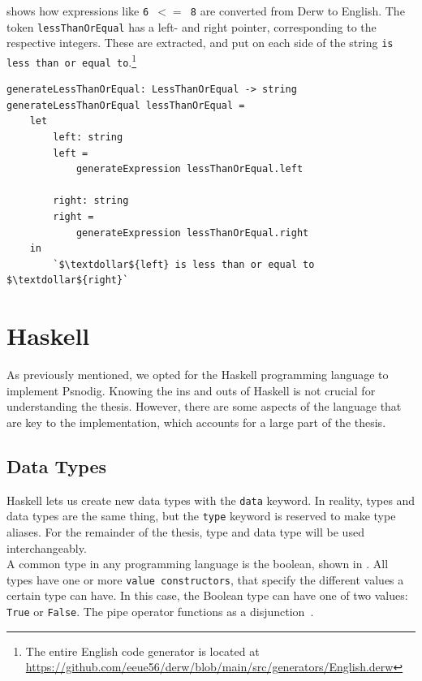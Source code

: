  shows how expressions like \texttt{6 $<=$ 8} are converted from Derw to English. The token \texttt{lessThanOrEqual} has a left- and right pointer, corresponding to the respective integers. These are extracted, and put on each side of the string \texttt{is less than or equal to}.\footnote{The entire English code generator is located at \url{https://github.com/eeue56/derw/blob/main/src/generators/English.derw}} \\

\begin{lstlisting}[caption={The function that converts a \texttt{Less than or equal}-expression in Derw to English.}, captionpos=b, label={LTE in Derw}]
generateLessThanOrEqual: LessThanOrEqual -> string
generateLessThanOrEqual lessThanOrEqual =
    let
        left: string
        left =
            generateExpression lessThanOrEqual.left

        right: string
        right =
            generateExpression lessThanOrEqual.right
    in
        `$\textdollar${left} is less than or equal to $\textdollar${right}`
\end{lstlisting}

\section{Haskell}

As previously mentioned, we opted for the Haskell programming language to implement Psnodig. Knowing the ins and outs of Haskell is not crucial for understanding the thesis. However, there are some aspects of the language that are key to the implementation, which accounts for a large part of the thesis.

\subsection{Data Types}

Haskell lets us create new data types with the \texttt{data} keyword. In reality, types and data types are the same thing, but the \texttt{type} keyword is reserved to make type aliases. For the remainder of the thesis, type and data type will be used interchangeably. \\

A common type in any programming language is the boolean, shown in . All types have one or more \texttt{value constructors}, that specify the different values a certain type can have. In this case, the Boolean type can have one of two values: \texttt{True} or \texttt{False}. The pipe operator functions as a disjunction~\cite[109]{LYAH}. \\

